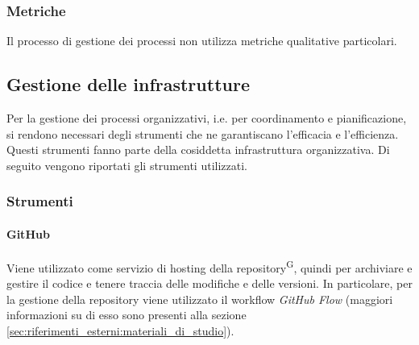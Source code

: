 \subsubsection{Metriche}\label{sec:processi_organizzativi:gestione_processi:metriche}
Il processo di gestione dei processi non utilizza metriche qualitative particolari.


\subsection{Gestione delle infrastrutture}\label{sec:processi_organizzativi:gestione_infrastrutture}
Per la gestione dei processi organizzativi, i.e. per coordinamento e pianificazione, si rendono necessari degli strumenti che ne garantiscano l'efficacia e l'efficienza. Questi strumenti fanno parte della cosiddetta infrastruttura organizzativa.
Di seguito vengono riportati gli strumenti utilizzati.

\subsubsection{Strumenti}

\paragraph{GitHub}
Viene utilizzato come servizio di hosting della repository\textsuperscript{G}, quindi per archiviare e gestire il codice e tenere traccia delle modifiche e delle versioni. In particolare, per la gestione della repository viene utilizzato il workflow \textit{GitHub Flow} (maggiori informazioni su di esso sono presenti alla sezione \ref{sec:riferimenti_esterni:materiali_di_studio}).

